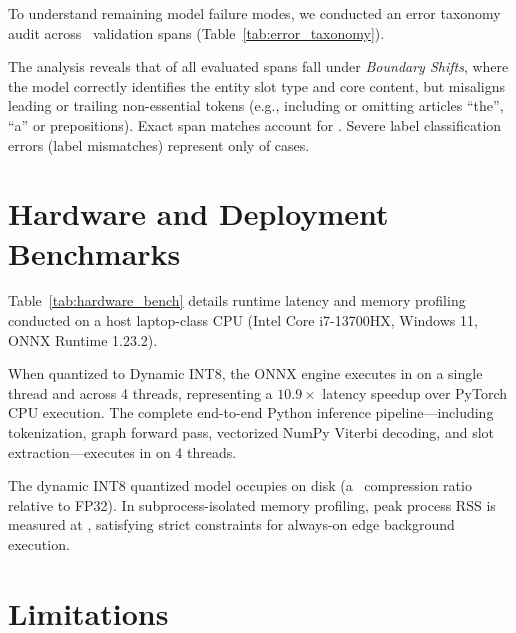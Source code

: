 \documentclass[letterpaper]{article}
\begin{document}


To understand remaining model failure modes, we conducted an error taxonomy audit across \TotalErrorSpans\ validation spans (Table~\ref{tab:error_taxonomy}).

The analysis reveals that \textbf{\ErrorBoundaryShiftPct} of all evaluated spans fall under \emph{Boundary Shifts}, where the model correctly identifies the entity slot type and core content, but misaligns leading or trailing non-essential tokens (e.g., including or omitting articles ``the'', ``a'' or prepositions). Exact span matches account for \textbf{\ErrorExactMatchPct}. Severe label classification errors (label mismatches) represent only \textbf{\ErrorLabelMismatchPct} of cases.

\section{Hardware and Deployment Benchmarks}



Table~\ref{tab:hardware_bench} details runtime latency and memory profiling conducted on a host laptop-class CPU (Intel Core i7-13700HX, Windows 11, ONNX Runtime 1.23.2).

When quantized to Dynamic INT8, the ONNX engine executes in \textbf{\ONNXINTOnetTLatencyMean} on a single thread and \textbf{\ONNXINTFourTLatencyMean} across 4 threads, representing a $10.9\times$ latency speedup over PyTorch CPU execution. The complete end-to-end Python inference pipeline---including tokenization, graph forward pass, vectorized NumPy Viterbi decoding, and slot extraction---executes in \textbf{\PipelineFourTLatencyMean} on 4 threads.

The dynamic INT8 quantized model occupies \textbf{\ModelSizeONNXINT} on disk (a \INTCompressionRatio\ compression ratio relative to FP32). In subprocess-isolated memory profiling, peak process RSS is measured at \textbf{\IsolatedPeakRSS}, satisfying strict constraints for always-on edge background execution.

\section{Limitations}
\end{document}
